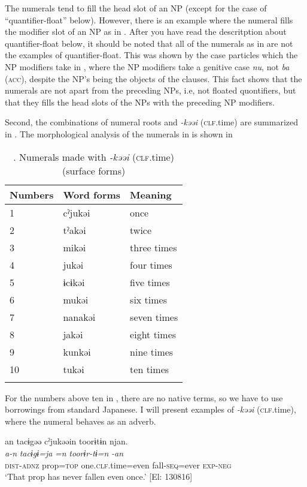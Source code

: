     \z
\z

The numerals tend to fill the head slot of an NP (except for the case of “quantifier-float” below). However, there is an example where the numeral fills the modifier slot of an NP as in . After you have read the descritption about quantifier-float below, it should be noted that all of the numerals as in  are not the examples of quantifier-float. This was shown by the case particles which the NP modifiers take in , where the NP modifiers take a genitive case \textit{nu}, not \textit{ba} (\textsc{acc}), despite the NP’s being the objects of the clauses. This fact shows that the numerals are not apart from the preceding NPs, i.e, not floated quontifiers, but that they fills the head slots of the NPs with the preceding NP modifiers.

Second, the combinations of numeral roots and \textit{{}-kəəi} (\textsc{clf}.time) are summarized in . The morphological analysis of the numerals in  is shown in 

\begin{table}
\caption{\label{tab:key:48}. Numerals made with \textit{-kəəi} (\textsc{clf}.time) (surface forms)}
\begin{tabular}{lll}
\lsptoprule
Numbers & Word forms  & Meaning\\
\midrule
1 & cˀjukəi&  once        \\
2 & tˀakəi & twice        \\
3 & mikəi  &three times   \\
4 & jukəi  &four times    \\
5 & ɨcɨkəi & five times   \\
6 & mukəi  &six times     \\
7 & nanakəi&  seven times \\
8 & jakəi  &eight times   \\
9 & kunkəi & nine times   \\
10&  tukəi & ten times    \\
\lspbottomrule
\end{tabular}
\end{table}

For the numbers above ten in , there are no native terms, so we have to use borrowings from standard Japanese. I will present examples of \textit{{}-kəəi} (\textsc{clf}.time), where the numeral behaves as an adverb.

\ea \label{ex:7:13}
\ea \label{ex:7:13a}{\TM}
\glll  an  tacɨgəə  cˀjukəəin  toorɨtɨn  njan.\\
\textit{a-n}  \textit{tacɨgɨ=ja}  \textit{=n}  \textit{toorɨr-tɨ=n}  \textit{-an}\\
\textsc{dist}-\textsc{adnz}  prop=\textsc{top}  one.\textsc{clf}.time=even  fall-\textsc{seq}=ever  \textsc{exp}-\textsc{neg}\\
\glt ‘That prop has never fallen even once.’ [El: 130816]

